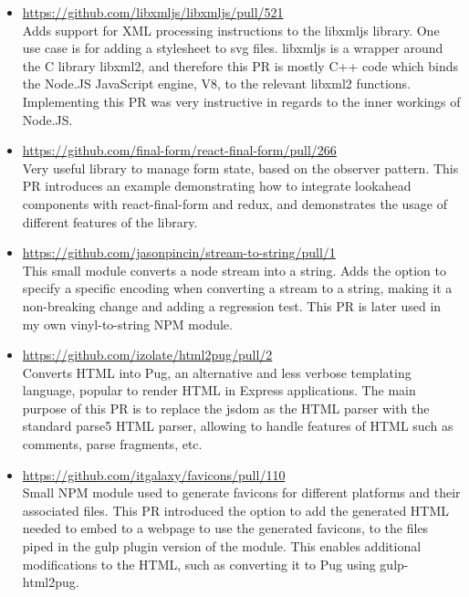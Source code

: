\documentclass{res}
\begin{document}
\begin{resume}
\begin{itemize}
  \item \url{https://github.com/libxmljs/libxmljs/pull/521} \\
  Adds support for XML processing instructions to the libxmljs library.
  One use case is for adding a stylesheet to svg files.
  libxmljs is a wrapper around the C library libxml2, and therefore this
  PR is mostly C++ code which binds the Node.JS JavaScript engine, V8, to
  the relevant libxml2 functions. Implementing this PR was very instructive
  in regards to the inner workings of Node.JS.

  \item \url{https://github.com/final-form/react-final-form/pull/266} \\
  Very useful library to manage form state, based on the observer pattern.
  This PR introduces an example demonstrating how to integrate lookahead components
  with react-final-form and redux, and demonstrates the usage of different
  features of the library.

  \item \url{https://github.com/jasonpincin/stream-to-string/pull/1} \\
  This small module converts a node stream into a string.
  Adds the option to specify a specific encoding when converting a stream to
  a string, making it a non-breaking change and adding a regression test.
  This PR is later used in my own vinyl-to-string NPM module.

  \item \url{https://github.com/izolate/html2pug/pull/2} \\
  Converts HTML into Pug, an alternative and less verbose templating language,
  popular to render HTML in Express applications. The main purpose of this PR
  is to replace the jsdom as the HTML parser with the standard parse5 HTML
  parser, allowing to handle features of HTML such as comments, parse fragments,
  etc.

  \item \url{https://github.com/itgalaxy/favicons/pull/110} \\
  Small NPM module used to generate favicons for different platforms and their
  associated files. This PR introduced the option to add the generated HTML
  needed to embed to a webpage to use the generated favicons, to the files piped
  in the gulp plugin version of the module. This enables additional modifications
  to the HTML, such as converting it to Pug using gulp-html2pug.
\end{itemize}


\end{resume}
\end{document}
